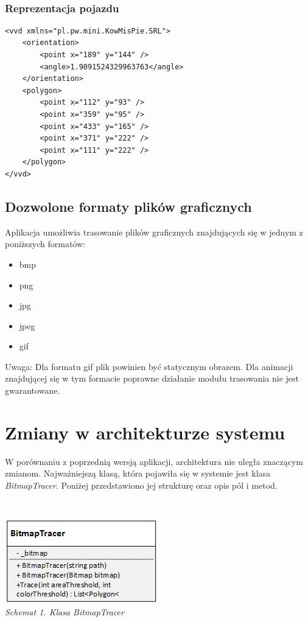 \documentclass{article}
\let\oldsection\section
\renewcommand\section{\clearpage\oldsection} %
\begin{document}
~\\\subsubsection{Reprezentacja pojazdu}
\begin{lstlisting}
<vvd xmlns="pl.pw.mini.KowMisPie.SRL">
	<orientation>
		<point x="189" y="144" />
		<angle>1.9091524329963763</angle>
	</orientation>
	<polygon>
		<point x="112" y="93" />
		<point x="359" y="95" />
		<point x="433" y="165" />
		<point x="371" y="222" />
		<point x="111" y="222" />
	</polygon>
</vvd>
\end{lstlisting}

\subsection{Dozwolone formaty plików graficznych}

Aplikacja umożliwia trasowanie plików graficznych znajdujących się w jednym z poniższych formatów:

\begin{itemize}
	\item bmp
	\item png
	\item jpg
	\item jpeg
	\item gif
\end{itemize}

Uwaga: Dla formatu gif plik powinien być statycznym obrazem. Dla animacji znajdującej się w tym formacie poprawne działanie modułu trasowania nie jest gwarantowane.

\section{Zmiany w architekturze systemu}

W porównaniu z poprzednią wersją aplikacji, architektura nie uległa znaczącym zmianom. Najważniejszą klasą, która pojawiła się w systemie jest klasa \textit{BitmapTracer}. Poniżej przedstawiono jej strukturę oraz opis pól i metod.

~\\\begin{center}
	\includegraphics[scale=1.0]{bitmaptracer-class}\\
	\textit{Schemat 1. Klasa BitmapTracer}
\end{center}
\end{document}
